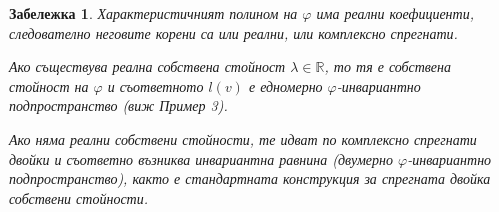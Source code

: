 \documentclass{scrartcl}
\newtheorem*{remark}{Забележка}
\begin{document}
\begin{FlushLeft}
\begin{remark}
Характеристичният полином на $\varphi$ има реални коефициенти, следователно неговите корени са или реални, или комплексно спрегнати.

Ако съществува реална собствена стойност $\lambda \in \mathbb{R}$, то тя е собствена стойност на $\varphi$ и съответното $l(v)$ е едномерно $\varphi$-инвариантно подпространство (виж Пример 3).

Ако няма реални собствени стойности, те идват по комплексно спрегнати двойки и съответно възниква инвариантна равнина (двумерно $\varphi$-инвариантно подпространство), както е стандартната конструкция за спрегната двойка собствени стойности.
\end{remark}

\end{FlushLeft}
\end{document}

